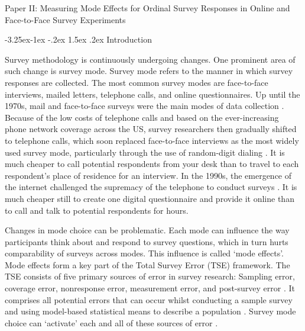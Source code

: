 \documentclass[12pt,]{article}
\makeatletter
\renewcommand\section{\@startsection {section}{1}{\z@} 
                                   {-3.5ex \@plus -1ex \@minus -.2ex}
                                   {2.3ex \@plus.2ex}
                                   {\large\bfseries\filcenter}} %
\renewcommand\subsection{\@startsection{subsection}{2}{\z@}%
                                     {-3.25ex\@plus -1ex \@minus -.2ex}
                                     {1.5ex \@plus .2ex}
                                     {\normalsize\bfseries}} %
\makeatother
\begin{document}
\clearpage

\hypertarget{paper-ii-measuring-mode-effects-for-ordinal-survey-responses-in-online-and-face-to-face-survey-experiments}{\section{Paper
II: Measuring Mode Effects for Ordinal Survey Responses in Online and
Face-to-Face Survey
Experiments}\label{paper-ii-measuring-mode-effects-for-ordinal-survey-responses-in-online-and-face-to-face-survey-experiments}}


\subsection{Introduction}\label{mode-intro}

Survey methodology is continuously undergoing changes. One prominent
area of such change is survey mode. Survey mode refers to the manner in
which survey responses are collected. The most common survey modes are
face-to-face interviews, mailed letters, telephone calls, and online
questionnaires. Up until the 1970s, mail and face-to-face surveys were
the main modes of data collection \citep{lyberg_1991_data}. Because of
the low costs of telephone calls and based on the ever-increasing phone
network coverage across the US, survey researchers then gradually
shifted to telephone calls, which soon replaced face-to-face interviews
as the most widely used survey mode, particularly through the use of
random-digit dialing \citep{dillman_2000_mail}. It is much cheaper to
call potential respondents from your desk than to travel to each
respondent's place of residence for an interview. In the 1990s, the
emergence of the internet challenged the supremacy of the telephone to
conduct surveys \citep{brick_2011_future}. It is much cheaper still to
create one digital questionnaire and provide it online than to call and
talk to potential respondents for hours.

Changes in mode choice can be problematic. Each mode can influence the
way participants think about and respond to survey questions, which in
turn hurts comparability of surveys across modes. This influence is
called `mode effects'. Mode effects form a key part of the Total Survey
Error (TSE) framework. The TSE consists of five primary sources of error
in survey research: Sampling error, coverage error, nonresponse error,
measurement error, and post-survey error \citep{weisberg_2005_total}. It
comprises all potential errors that can occur whilst conducting a sample
survey and using model-based statistical means to describe a population
\citep{biemer_2010_overview}. Survey mode choice can `activate' each and
all of these sources of error
\citep{groves_2010_total, weisberg_2005_total, ansolabehere_2014_does, atkeson_2014_nonresponse, ye_2011_more, yeager_2011_comparing, bowyer_2017_mode}.
\end{document}
